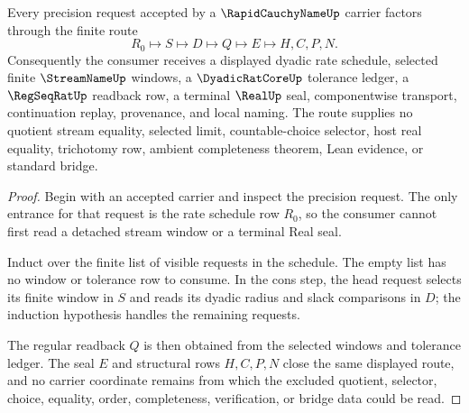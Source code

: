 \begin{theorem}
\label{thm:rapid-cauchy-name-dyadic-rate-route}
Every precision request accepted by a $\RapidCauchyNameUp$ carrier factors through the finite route
$$
R_0\longmapsto S\longmapsto D\longmapsto Q\longmapsto E\longmapsto H,C,P,N .
$$
Consequently the consumer receives a displayed dyadic rate schedule, selected finite $\StreamNameUp$ windows, a $\DyadicRatCoreUp$ tolerance ledger, a $\RegSeqRatUp$ readback row, a terminal $\RealUp$ seal, componentwise transport, continuation replay, provenance, and local naming. The route supplies no quotient stream equality, selected limit, countable-choice selector, host real equality, trichotomy row, ambient completeness theorem, Lean evidence, or standard bridge.
\end{theorem}
\begin{proof}
Begin with an accepted carrier and inspect the precision request. The only entrance for that request is the rate schedule row $R_0$, so the consumer cannot first read a detached stream window or a terminal Real seal.

Induct over the finite list of visible requests in the schedule. The empty list has no window or tolerance row to consume. In the cons step, the head request selects its finite window in $S$ and reads its dyadic radius and slack comparisons in $D$; the induction hypothesis handles the remaining requests.

The regular readback $Q$ is then obtained from the selected windows and tolerance ledger. The seal $E$ and structural rows $H,C,P,N$ close the same displayed route, and no carrier coordinate remains from which the excluded quotient, selector, choice, equality, order, completeness, verification, or bridge data could be read.
\end{proof}

